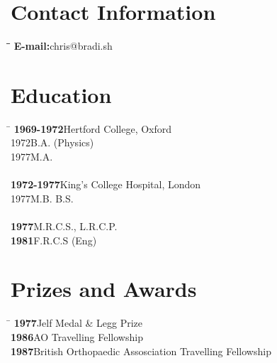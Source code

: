 \documentclass[margin,line]{res}
\begin{document}
\begin{resume}
\section{\sc Contact Information}
\begin{tabbing}
\hspace{1.3in}\=\hspace{1.3in}\=\hspace{1.3in}\=\hspace{1.3in}\kill
\>\>\textbf{E-mail:}\>chris@bradi.sh\\             
\end{tabbing}


\section{\sc Education}
\vspace{-.128in}
\begin{tabbing}
\hspace{2.3in}\=\hspace{2.3in}\kill
\textbf{1969-1972}\>Hertford College, Oxford\\
1972\>B.A. (Physics)\\
1977\>M.A.\\
\\
\textbf{1972-1977}\>King's College Hospital, London\\
1977\>M.B. B.S.\\
\\
\textbf{1977}\>M.R.C.S., L.R.C.P.\\
\textbf{1981}\>F.R.C.S (Eng)\\
\end{tabbing}

\section{\sc Prizes and Awards}
\vspace{-.128in}
\begin{tabbing}
\hspace{2.3in}\=\hspace{2.3in}\kill
\textbf{1977}\>Jelf Medal \& Legg Prize\\
\textbf{1986}\>AO Travelling Fellowship\\
\textbf{1987}\>British Orthopaedic Assosciation Travelling Fellowship\\
\end{tabbing}


\end{resume}
\end{document}
